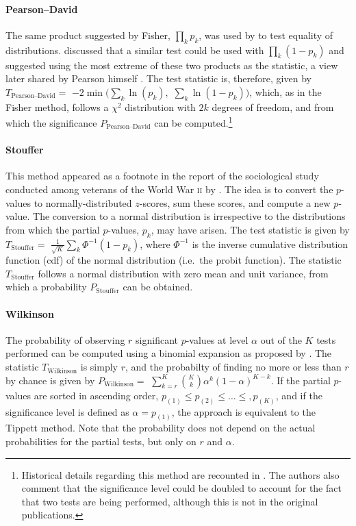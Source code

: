 \paragraph{Pearson--David} The same product suggested by Fisher, $\prod_{k} p_{k}$, was used by \citet{Pearson1933} to test equality of distributions. \citet{David1934} discussed that a similar test could be used with $\prod_{k} (1-p_{k})$ and suggested using the most extreme of these two products as the statistic, a view later shared by Pearson himself \citep{Pearson1934}. The test statistic is, therefore, given by $T_{\text{Pearson--David}}=$ $-2\min\big(\sum_{k} \ln\left(p_{k}\right),$ $\sum_{k} \ln\left(1-p_{k}\right)\big)$, which, as in the Fisher method, follows a $\chi^{2}$ distribution with $2k$ degrees of freedom, and from which the significance $P_{\text{Pearson--David}}$ can be computed.\footnote{Historical details regarding this method are recounted in \citet{Owen2009}. The authors also comment that the significance level could be doubled to account for the fact that two tests are being performed, although this is not in the original publications.}

\paragraph{Stouffer} This method appeared as a footnote in the report of the sociological study conducted among veterans of the World War \textsc{ii} by \citet{Stouffer1949}. The idea is to convert the $p$-values to normally-distributed $z$-scores, sum these scores, and compute a new $p$-value. The conversion to a normal distribution is irrespective to the distributions from which the partial $p$-values, $p_{k}$, may have arisen. The test statistic is given by $T_{\text{Stouffer}} =$ $\frac{1}{\sqrt{K}} \sum_{k} \Phi^{-1}\left(1-p_{k}\right)$, where $\Phi^{-1}$ is the inverse cumulative distribution function (cdf) of the normal distribution (i.e.\ the probit function). The statistic $T_{\text{Stouffer}}$ follows a normal distribution with zero mean and unit variance, from which a probability $P_{\text{Stouffer}}$ can be obtained.

\paragraph{Wilkinson} The probability of observing $r$ significant $p$-values at level $\alpha$ out of the $K$ tests performed can be computed using a binomial expansion as proposed by \citet{Wilkinson1951}. The statistic $T_{\text{Wilkinson}}$ is simply $r$, and the probabilty of finding no more or less than $r$ by chance is given by $P_{\text{Wilkinson}} =$ $\sum_{k=r}^{K}\binom{K}{k}\alpha^{k}(1-\alpha)^{K-k}$. If the partial $p$-values are sorted in ascending order, $p_{(1)} \leqslant p_{(2)} \leqslant \ldots \leqslant, p_{(K)}$, and if the significance level is defined as $\alpha=p_{(1)}$, the approach is equivalent to the Tippett method. Note that the probability does not depend on the actual probabilities for the partial tests, but only on $r$ and $\alpha$.

